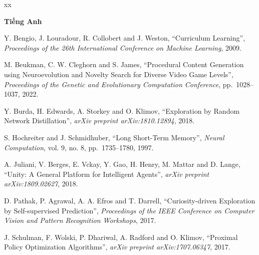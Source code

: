 \documentclass[a4paper,12pt,oneside]{book}
\renewcommand{\baselinestretch}{1.4}
\begin{document}
\appendix

\def\baselinestretch{1}
\vspace{-2cm}
\renewcommand{\bibname}{Tài liệu tham khảo}
\clearpage
{}
{}
\begin{thebibliography}{xx}
\item[]\textbf{Tiếng Anh}

	Y. Bengio, J. Louradour, R. Collobert and J. Weston, ``Curriculum Learning'',
	{\em Proceedings of the 26th International Conference on Machine Learning}, 2009.

	M. Beukman, C. W. Cleghorn and S. James, ``Procedural Content Generation using Neuroevolution and Novelty Search for Diverse Video Game Levels'',
	{\em Proceedings of the Genetic and Evolutionary Computation Conference}, pp.~1028--1037, 2022.

	Y. Burda, H. Edwards, A. Storkey and O. Klimov, ``Exploration by Random Network Distillation'',
	{\em arXiv preprint arXiv:1810.12894}, 2018.

	S. Hochreiter and J. Schmidhuber, ``Long Short-Term Memory'',
	{\em Neural Computation}, vol. 9, no. 8, pp.~1735--1780, 1997.

	A. Juliani, V. Berges, E. Vckay, Y. Gao, H. Henry, M. Mattar and D. Lange, ``Unity: A General Platform for Intelligent Agents'',
	{\em arXiv preprint arXiv:1809.02627}, 2018.

	D. Pathak, P. Agrawal, A. A. Efros and T. Darrell, ``Curiosity-driven Exploration by Self-supervised Prediction'',
	{\em Proceedings of the IEEE Conference on Computer Vision and Pattern Recognition Workshops}, 2017.

	J. Schulman, F. Wolski, P. Dhariwal, A. Radford and O. Klimov, ``Proximal Policy Optimization Algorithms'',
	{\em arXiv preprint arXiv:1707.06347}, 2017.

\end{thebibliography}
\end{document}
